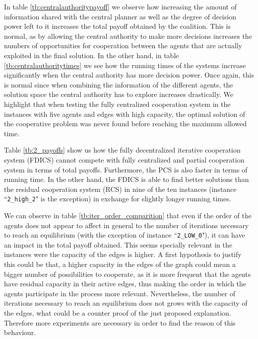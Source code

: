 \documentclass{article}
\begin{document}
In table \ref{tb:centralauthoritypayoff} we observe how increasing the amount of information shared with the central planner as well as the degree of decision power left to it increases the total payoff obtained by the coalition. This is normal, as by allowing the central authority to make more decisions increases the numbers of opportunities for cooperation between the agents that are actually exploited in the final solution. In the other hand, in table \ref{tb:centralauthoritytimes} we see how the running times of the systems increase significantly when the central authority has more decision power. Once again, this is normal since when combining the information of the different agents, the solution space the central authority has to explore increases drastically. We highlight that when testing the fully centralized cooperation system in the instances with five agents and edges with high capacity, the optimal solution of the cooperative problem was never found before reaching the maximum allowed time.

Table \ref{tb:2_payoffs} show us how the fully decentralized iterative cooperation system (FDICS) cannot compete with fully centralized and partial cooperation system in terms of total payoffs. Furthermore, the PCS is also faster in terms of running time. In the other hand, the FDICS is able to find better solutions than the residual cooperation system (RCS) in nine of the ten instances (instance ``\texttt{2\_high\_2}" is the exception) in exchange for slightly longer running times.

We can observe in table \ref{tb:iter_order_comparition} that even if the order of the agents does not appear to affect in general to the number of iterations necessary to reach an equilibrium (with the exception of instance ``\texttt{2\_LOW\_0}"), it can have an impact in the total payoff obtained. This seems specially relevant in the instances were the capacity of the edges is higher. A first hypothesis to justify this could be that, a higher capacity in the edges of the graph could mean a bigger number of possibilities to cooperate, as it is more frequent that the agents have residual capacity in their active edges, thus making the order in which the agents participate in the process more relevant. Nevertheless, the number of iterations necessary to reach an equilibrium does not grows with the capacity of the edges, what could be a counter proof of the just proposed explanation. Therefore more experiments are necessary in order to find the reason of this behaviour. 
\end{document}
